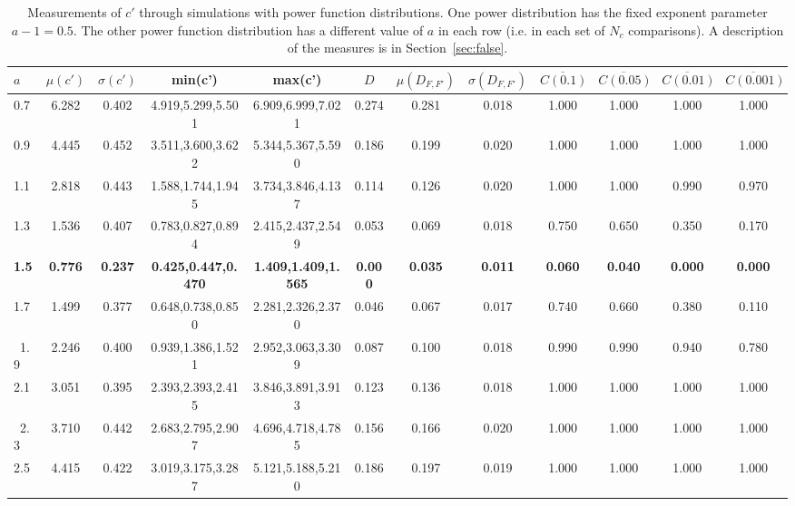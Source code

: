 \begin{table*}[h!]
\caption{Measurements of $c'$ through simulations
        with power function distributions.
        One power distribution has the fixed exponent parameter $a-1=0.5$.
        The other power function distribution
	has a different value of $a$ in each row (i.e. in each set of $N_c$ comparisons).
	A description of the measures is in Section~\ref{sec:false}.
	}\label{tab:false1}
\tiny
\begin{center}
\begin{tabular}{ l | c | c | c | c | c | c | c | c | c | c | c }
$a$ & $\mu(c')$ & $\sigma(c')$ & min(c') & max(c') & $D$ & $\mu(D_{F,F'})$ & $\sigma(D_{F,F'})$ & $\overline{C(0.1)}$ & $\overline{C(0.05)}$ & $\overline{C(0.01)}$ &  $\overline{C(0.001)}$ \\\hline
0.7 & 6.282 & 0.402 & 4.919,5.299,5.501 & 6.909,6.999,7.021  & 0.274  & 0.281  & 0.018  & 1.000  & 1.000 & 1.000  & 1.000 \\
0.9 & 4.445 & 0.452 & 3.511,3.600,3.622 & 5.344,5.367,5.590  & 0.186  & 0.199  & 0.020  & 1.000  & 1.000 & 1.000  & 1.000 \\\hline
1.1 & 2.818 & 0.443 & 1.588,1.744,1.945 & 3.734,3.846,4.137  & 0.114  & 0.126  & 0.020  & 1.000  & 1.000 & 0.990  & 0.970 \\
1.3 & 1.536 & 0.407 & 0.783,0.827,0.894 & 2.415,2.437,2.549  & 0.053  & 0.069  & 0.018  & 0.750  & 0.650 & 0.350  & 0.170 \\\hline
{\bf 1.5} & {\bf 0.776} & {\bf 0.237} & {\bf 0.425,0.447,0.470} & {\bf 1.409,1.409,1.565} & {\bf 0.000} & {\bf 0.035} & {\bf 0.011} & {\bf 0.060} & {\bf 0.040} & {\bf 0.000} & {\bf 0.000} \\\hline
1.7 & 1.499 & 0.377 & 0.648,0.738,0.850 & 2.281,2.326,2.370  & 0.046  & 0.067  & 0.017  & 0.740  & 0.660 & 0.380 & 0.110 \\\
1.9 & 2.246 & 0.400 & 0.939,1.386,1.521 & 2.952,3.063,3.309  & 0.087  & 0.100  & 0.018  & 0.990  & 0.990 & 0.940 & 0.780 \\\hline
2.1 & 3.051 & 0.395 & 2.393,2.393,2.415 & 3.846,3.891,3.913  & 0.123  & 0.136  & 0.018  & 1.000  & 1.000 & 1.000 & 1.000 \\\
2.3 & 3.710 & 0.442 & 2.683,2.795,2.907 & 4.696,4.718,4.785  & 0.156  & 0.166  & 0.020  & 1.000  & 1.000 & 1.000 & 1.000 \\\hline
2.5 & 4.415 & 0.422 & 3.019,3.175,3.287 & 5.121,5.188,5.210  & 0.186  & 0.197  & 0.019  & 1.000  & 1.000 & 1.000 & 1.000 \\
\end{tabular}
\end{center}
\end{table*}

